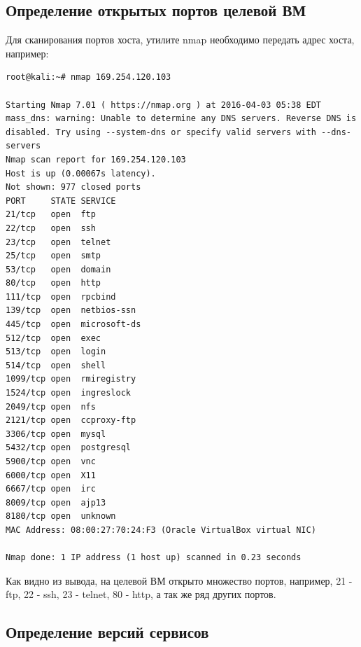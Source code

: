 \documentclass[10pt,a4paper]{report}
\begin{document}
	\subsection{Определение открытых портов целевой ВМ}
		Для сканирования портов хоста, утилите nmap необходимо передать адрес хоста, например:
		\begin{verbatim}
root@kali:~# nmap 169.254.120.103

Starting Nmap 7.01 ( https://nmap.org ) at 2016-04-03 05:38 EDT
mass_dns: warning: Unable to determine any DNS servers. Reverse DNS is disabled. Try using --system-dns or specify valid servers with --dns-servers
Nmap scan report for 169.254.120.103
Host is up (0.00067s latency).
Not shown: 977 closed ports
PORT     STATE SERVICE
21/tcp   open  ftp
22/tcp   open  ssh
23/tcp   open  telnet
25/tcp   open  smtp
53/tcp   open  domain
80/tcp   open  http
111/tcp  open  rpcbind
139/tcp  open  netbios-ssn
445/tcp  open  microsoft-ds
512/tcp  open  exec
513/tcp  open  login
514/tcp  open  shell
1099/tcp open  rmiregistry
1524/tcp open  ingreslock
2049/tcp open  nfs
2121/tcp open  ccproxy-ftp
3306/tcp open  mysql
5432/tcp open  postgresql
5900/tcp open  vnc
6000/tcp open  X11
6667/tcp open  irc
8009/tcp open  ajp13
8180/tcp open  unknown
MAC Address: 08:00:27:70:24:F3 (Oracle VirtualBox virtual NIC)

Nmap done: 1 IP address (1 host up) scanned in 0.23 seconds
		\end{verbatim}
		
		Как видно из вывода, на целевой ВМ открыто множество портов, например, 21 - ftp, 22 - ssh, 23 - telnet, 80 - http, а так же ряд других портов.
	\subsection{Определение версий сервисов}
	
\end{document}
